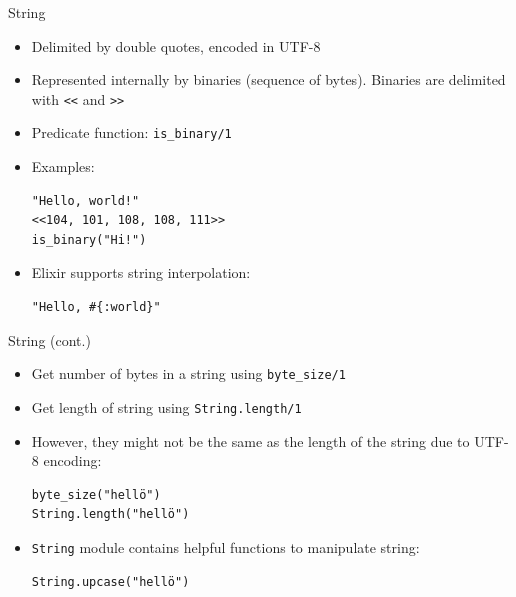 \documentclass[12pt]{beamer}
\begin{document}
\begin{frame}[fragile]{String}
  \begin{itemize}
    \item Delimited by double quotes, encoded in UTF-8
    \item Represented internally by binaries (sequence of bytes). Binaries are delimited with \texttt{<<} and \texttt{>>}
    \item Predicate function: \texttt{is_binary/1}
    \item Examples:
          \begin{verbatim}
"Hello, world!"
<<104, 101, 108, 108, 111>>
is_binary("Hi!")
  \end{verbatim}
    \item Elixir supports string interpolation:
          \begin{verbatim}
"Hello, #{:world}"
  \end{verbatim}
  \end{itemize}
\end{frame}

\begin{frame}[fragile]{String (cont.)}
  \begin{itemize}
    \item Get number of bytes in a string using \texttt{byte_size/1}
    \item Get length of string using \texttt{String.length/1}
    \item However, they might not be the same as the length of the string due to UTF-8 encoding:
          \begin{verbatim}
byte_size("hellö")
String.length("hellö")
          \end{verbatim}
    \item \texttt{String} module contains helpful functions to manipulate string:
          \begin{verbatim}
String.upcase("hellö")
        \end{verbatim}
  \end{itemize}
\end{frame}
\end{document}
